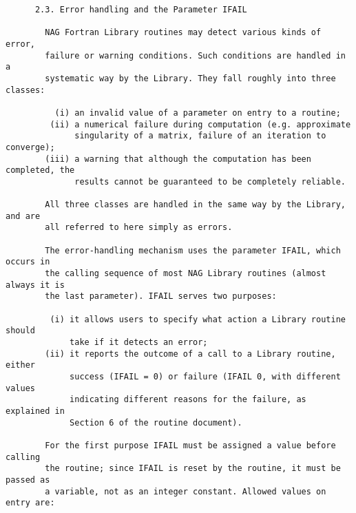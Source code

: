 \begin{small}
\begin{verbatim}
      2.3. Error handling and the Parameter IFAIL                                 
                                                                                  
        NAG Fortran Library routines may detect various kinds of error,           
        failure or warning conditions. Such conditions are handled in a           
        systematic way by the Library. They fall roughly into three classes:      
                                                                                  
          (i) an invalid value of a parameter on entry to a routine;              
         (ii) a numerical failure during computation (e.g. approximate            
              singularity of a matrix, failure of an iteration to converge);      
        (iii) a warning that although the computation has been completed, the     
              results cannot be guaranteed to be completely reliable.             
                                                                                  
        All three classes are handled in the same way by the Library, and are     
        all referred to here simply as errors.                                    
                                                                                  
        The error-handling mechanism uses the parameter IFAIL, which occurs in    
        the calling sequence of most NAG Library routines (almost always it is    
        the last parameter). IFAIL serves two purposes:                           
                                                                                  
         (i) it allows users to specify what action a Library routine should      
             take if it detects an error;                                         
        (ii) it reports the outcome of a call to a Library routine, either        
             success (IFAIL = 0) or failure (IFAIL 0, with different values       
             indicating different reasons for the failure, as explained in        
             Section 6 of the routine document).                                  
                                                                                  
        For the first purpose IFAIL must be assigned a value before calling       
        the routine; since IFAIL is reset by the routine, it must be passed as    
        a variable, not as an integer constant. Allowed values on entry are:      
                                                                                  

\end{verbatim}
\end{small}
